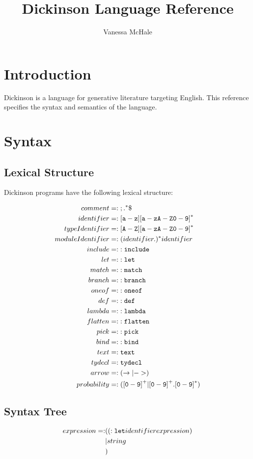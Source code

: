 \documentclass{book}
\begin{document}
\title{Dickinson Language Reference}
\author {Vanessa McHale}
\maketitle

\tableofcontents

\section{Introduction}

Dickinson is a language for generative literature targeting English. This reference specifies the syntax and semantics of the language.

\section{Syntax}

\subsection{Lexical Structure}

Dickinson programs have the following lexical structure:

\begin{align*}
    comment &=: {\tt ; .}^*\$ \\
    identifier &=: {\tt [a-z][a-zA-Z0-9]}^* \\
    typeIdentifier &=: {\tt [A-Z][a-zA-Z0-9]}^* \\
    moduleIdentifier &=: (identifier.)^* identifier \\
    include &=: {\tt :include} \\
    let &=: {\tt :let} \\
    match &=: {\tt :match} \\
    branch &=: {\tt :branch} \\
    oneof &=: {\tt :oneof} \\
    def &=: {\tt :def} \\
    lambda &=: {\tt :lambda} \\
    flatten &=: {\tt :flatten} \\
    pick &=: {\tt :pick} \\
    bind &=: {\tt :bind} \\
    text &=: {\tt text} \\
    tydecl &=: {\tt tydecl} \\
    arrow &=: (\rightarrow | {\tt ->}) \\
    probability &=: ({\tt [0-9]}^+| {\tt [0-9]}^+.{\tt [0-9]}^*)
\end{align*}

\subsection{Syntax Tree}

\begin{align*}
    expression =: &( ({\tt :let} identifier expression) \\
               &| string \\
               &)
\end{align*}
\end{document}
